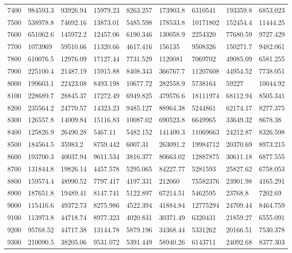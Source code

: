 \begin{table}[]
{\begin{tabular}{|l|l|l|l|l|l|l|l|l|}
7400 & 984593.3 & 93926.94 & 15979.23 & 8263.257 & 173903.8 & 6310541 & 193359.8 & 6853.023 \\
7500 & 538978.8 & 74692.16 & 13873.01 & 5485.598 & 178533.8 & 10171802 & 152454.4 & 11444.25 \\
7600 & 651062.6 & 145972.2 & 12457.06 & 6190.346 & 130058.9 & 2254320 & 77680.59 & 9727.429 \\
7700 & 1073969 & 59510.66 & 11320.66 & 4617.416 & 156135 & 9508326 & 150271.7 & 9482.061 \\
7800 & 610076.5 & 12976.09 & 17127.44 & 7731.529 & 1120081 & 7069702 & 49085.09 & 6581.255 \\
7900 & 225100.4 & 21487.19 & 15915.88 & 8408.343 & 366767.7 & 11207608 & 44954.52 & 7738.051 \\
8000 & 199603.1 & 22423.08 & 8493.198 & 10677.72 & 282558.9 & 5738164 & 59227 & 10044.92 \\
8100 & 228689.7 & 28845.37 & 17272.49 & 6949.825 & 479576.6 & 18111974 & 68112.94 & 8505.341 \\
8200 & 235564.2 & 24770.57 & 14323.23 & 9485.127 & 88964.38 & 5244861 & 62174.17 & 8277.375 \\
8300 & 126557.8 & 14009.84 & 15116.83 & 10087.02 & 690523.8 & 6649965 & 33649.32 & 8678.38 \\
8400 & 125826.9 & 26490.28 & 5467.11 & 5482.152 & 141400.3 & 11069663 & 24212.87 & 8326.598 \\
8500 & 184564.5 & 35983.2 & 8759.442 & 6007.31 & 263091.2 & 19984712 & 20370.69 & 8973.215 \\
8600 & 193700.3 & 40037.94 & 9611.534 & 3816.377 & 80663.02 & 12887875 & 30611.18 & 6877.555 \\
8700 & 131844.8 & 19826.14 & 4457.578 & 5295.065 & 84227.77 & 5281593 & 25827.62 & 6758.053 \\
8800 & 159574.4 & 48990.52 & 7797.417 & 4197.331 & 212060 & 75582376 & 23901.98 & 4165.291 \\
8900 & 187651.8 & 19489.41 & 8147.741 & 5122.897 & 67214.51 & 5462595 & 23768.8 & 7202.69 \\
9000 & 115416.6 & 49372.73 & 8275.986 & 4522.394 & 41884.84 & 12775294 & 24709.44 & 8464.759 \\
9100 & 113973.8 & 44718.74 & 8977.323 & 4020.831 & 30371.49 & 6320431 & 21859.27 & 6555.091 \\
9200 & 95768.52 & 44717.38 & 13144.78 & 5879.196 & 34368.44 & 5331262 & 20166.51 & 7530.378 \\
9300 & 210090.5 & 38205.06 & 9531.072 & 5391.449 & 58940.26 & 6143711 & 24092.68 & 8377.303 \\

\end{tabular}}
\end{table}
